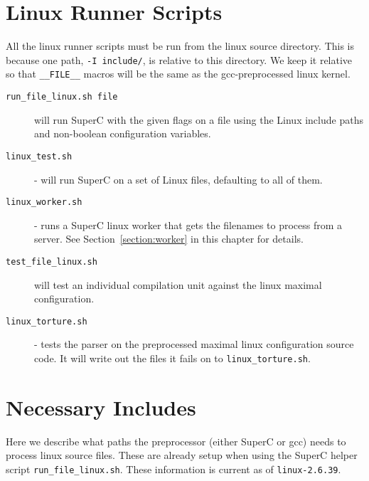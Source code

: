 \documentclass{report}
\newcommand{\SuperC}{{\textsf{Su\-perC}}}
\begin{document}
\section{Linux Runner Scripts}
\label{section:runners}

All the linux runner scripts must be run from the linux source
directory.  This is because one path, \verb"-I include/", is relative to
this directory.  We keep it relative so that \verb'__FILE__' macros
will be the same as the gcc-preprocessed linux kernel.

\begin{description}

\item[\texttt{run\_file\_linux.sh file}] will run \SuperC{}
  with the given flags on a file using the Linux include paths and
  non-boolean configuration variables.

\item[\texttt{linux\_test.sh}] - will run \SuperC{} on a set of Linux files,
  defaulting to all of them.

\item[\texttt{linux\_worker.sh}] - runs a \SuperC{} linux worker that gets
  the filenames to process from a server.  See
  Section~\ref{section:worker} in this chapter for details.

\item[\texttt{test\_file\_linux.sh}] will test an individual compilation unit
  against the linux maximal configuration.

\item[\texttt{linux\_torture.sh}] - tests the parser on the preprocessed
  maximal linux configuration source code.  It will write out the
  files it fails on to \verb"linux_torture.sh".

\end{description}



\section{Necessary Includes}

Here we describe what paths the preprocessor (either \SuperC{} or gcc)
needs to process linux source files.  These are already setup when
using the \SuperC{} helper script \verb'run_file_linux.sh'.  These
information is current as of \verb"linux-2.6.39".
\end{document}
